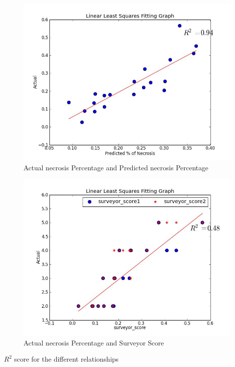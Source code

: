 \documentclass[conference]{IEEEtran}
\begin{document}
{\begin{figure}[t!]
\centering
\includegraphics[scale=0.25]{images/Actual_Predicted.jpg}
\caption{Actual necrosis Percentage and Predicted necrosis Percentage}
\label{fig:Relatio2}
\end{figure}

\begin{figure}[t!]
\centering
\includegraphics[scale=0.25]{images/Actual_surveyor.jpg}
\caption{ Actual necrosis Percentage and Surveyor Score }
\label{fig:Relatio3}
\end{figure}


\begin{table}[t!]
\renewcommand{\arraystretch}{1.3}
\caption{$R^{2}$ score for the different relationships }


\end{table}}
\end{document}
